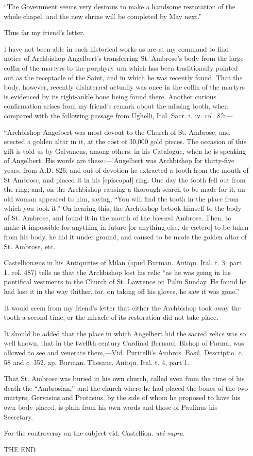 ``The Government seems very desirous to make a handsome
restoration of the whole chapel, and the new shrine will be completed
by May next.''

Thus far my friend's letter.

I have not been able in such historical works as are at my command
to find notice of Archbishop Angelbert's transferring St. Ambrose's
body from the large coffin of the martyrs to the porphyry urn which
has been traditionally pointed out as the receptacle of the Saint, and
in which he was recently found. That the body, however, recently
disinterred actually was once in the coffin of the martyrs is
evidenced by its right-ankle bone being found there. Another curious
confirmation arises from my friend's remark about the missing tooth,
when compared with the following passage from Ughelli, Ital. Sacr. t.
iv. col. 82:—

``Archbishop Angelbert was most devout to the Church of St.
Ambrose, and erected a golden altar in it, at the cost of 30,000 gold
pieces. The occasion of this gift is told us by Galvaneus, among
others, in his Catalogue, when he is speaking of Angelbert. His words
are these:—'Angelbert was Archbishop for thirty-five years, from A.D.
826, and out of devotion he extracted a tooth from the mouth of St
Ambrose, and placed it in his [episcopal] ring. One day the tooth fell
out from the ring; and, on the Archbishop causing a thorough search to
be made for it, an old woman appeared to him, saying, ``You will
find the tooth in the place from which you took it.'' On hearing
this, the Archbishop betook himself to the body of St. Ambrose, and
found it in the mouth of the blessed Ambrose. Then, to make it
impossible for anything in future [or anything else, de cætero] to be
taken from his body, he hid it under ground, and caused to be made the
golden altar of St. Ambrose, etc.

Castellionæus in his Antiquities of Milan (apud Burman. Antiqu.
Ital. t. 3, part 1. col. 487) tells us that the Archbishop lost his
relic ``as he was going in his pontifical vestments to the Church
of St. Lawrence on Palm Sunday. He found he had lost it in the way
thither, for, on taking off his gloves, he saw it was gone.''

It would seem from my friend's letter that either the Archbishop
took away the tooth a second time, or the miracle of its restoration
did not take place.

It should be added that the place in which Angelbert hid the sacred
relics was so well known, that in the twelfth century Cardinal
Bernard, Bishop of Parma, was allowed to see and venerate them,—Vid.
Puricelli's Ambros. Basil. Descriptio. c. 58 and c. 352, ap. Burman.
Thesaur. Antiqu. Ital. t. 4, part 1.

That St. Ambrose was buried in his own church, called even from the
time of his death the ``Ambrosian,'' and the church where he
had placed the bones of the two martyrs, Gervasius and Protasius, by
the side of whom he proposed to have his own body placed, is plain
from his own words and those of Paulinus his Secretary.

For the controversy on the subject vid. Castellion. \emph{ubi supra}.

THE END
